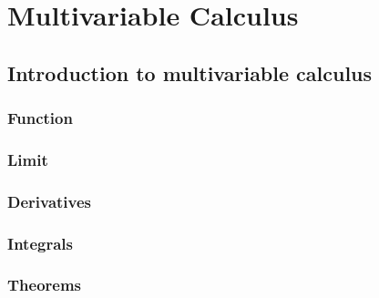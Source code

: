 \documentclass[letterpaper,10pt,english]{jupyterBook}
\begin{document}
\sphinxstepscope


\part{Multivariable Calculus}

\sphinxstepscope


\chapter{Introduction to multi\sphinxhyphen{}variable calculus}
\label{\detokenize{ch/multivariable/intro:introduction-to-multi-variable-calculus}}\label{\detokenize{ch/multivariable/intro:multivariable-calculus}}\label{\detokenize{ch/multivariable/intro::doc}}

\section{Function}
\label{\detokenize{ch/multivariable/intro:function}}\label{\detokenize{ch/multivariable/intro:multivariable-calculus-fun}}

\section{Limit}
\label{\detokenize{ch/multivariable/intro:limit}}\label{\detokenize{ch/multivariable/intro:multivariable-calculus-lim}}

\section{Derivatives}
\label{\detokenize{ch/multivariable/intro:derivatives}}\label{\detokenize{ch/multivariable/intro:multivariable-calculus-der}}

\section{Integrals}
\label{\detokenize{ch/multivariable/intro:integrals}}\label{\detokenize{ch/multivariable/intro:multivariable-calculus-int}}

\section{Theorems}
\label{\detokenize{ch/multivariable/intro:theorems}}
\end{document}
